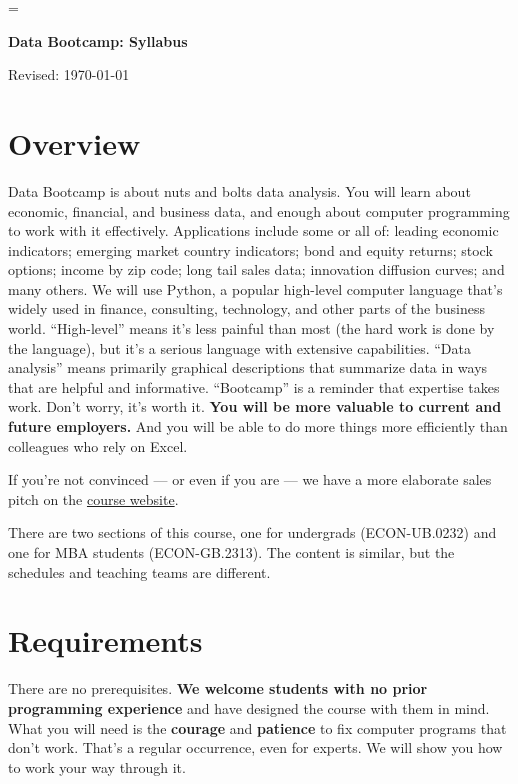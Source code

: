 \documentclass[11pt]{article}
\begin{document}
\parskip=\bigskipamount
\parindent=0.0in
\thispagestyle{empty}


\bigskip\bigskip
\centerline{\Large \bf Data Bootcamp:  Syllabus}
\centerline{Revised: \today}


\section*{Overview}

Data Bootcamp is about nuts and bolts data analysis. You will learn about economic, financial, and business
data, and enough about computer programming to work with it effectively.
Applications include some or all of: leading economic indicators; emerging market country indicators;
bond and equity returns; stock options; income by zip code; long tail sales data; innovation diffusion curves; and many others.
We will use Python, a popular high-level computer language that's widely used in finance, consulting,
technology, and other parts of the business world.
``High-level'' means it's less painful than most (the hard work is done by the language),
but it's a serious language with extensive capabilities.
``Data analysis'' means primarily graphical descriptions that summarize data
in ways that are helpful and informative.
``Bootcamp'' is a reminder that expertise takes work. Don't worry, it's worth it.
{\bf You will be more valuable to current and future employers.\/} 
And you will be able to do more things more efficiently than 
colleagues who rely on Excel. 

If you're not convinced --- or even if you are ---
we have a more elaborate sales pitch on the 
\href{http://databootcamp.nyuecon.com/}{course website}.

There are two sections of this course,
one for undergrads (ECON-UB.0232) and one for MBA students (ECON-GB.2313).
The content is similar, but the schedules and teaching teams are different.


\section*{Requirements}

There are no prerequisites.
{\bf We welcome students with no prior programming experience\/}
and have designed the course with them in mind.
What you will need is the {\bf courage\/} and {\bf patience\/} to fix computer programs that don't work.
That's a regular occurrence, even for experts.
We will show you how to work your way through it.
\end{document}
